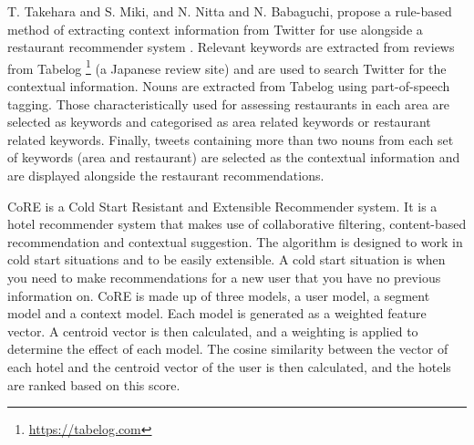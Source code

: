 T. Takehara and S. Miki, and N. Nitta  and N. Babaguchi, propose a rule-based method of extracting context information from Twitter for use alongside a restaurant recommender system \cite{takeharaContext2012}. Relevant keywords are extracted from reviews from Tabelog \footnote{\url{https://tabelog.com}} (a Japanese review site) and are used to search Twitter for the contextual information. Nouns are extracted from Tabelog using part-of-speech tagging. Those characteristically used for assessing restaurants in each area are selected as keywords and categorised as area related keywords or restaurant related keywords. Finally, tweets containing more than two nouns from each set of keywords (area and restaurant) are selected as the contextual information and are displayed alongside the restaurant recommendations.

CoRE \cite{core2019} is a Cold Start Resistant and Extensible Recommender system. It is a hotel recommender system that makes use of collaborative filtering, content-based recommendation and contextual suggestion. The algorithm is designed to work in cold start situations and to be easily extensible. A cold start situation is when you need to make recommendations for a new user that you have no previous information on. CoRE is made up of three models, a user model, a segment model and a context model. Each model is generated as a weighted feature vector. A centroid vector is then calculated, and a weighting is applied to determine the effect of each model. The cosine similarity between the vector of each hotel and the centroid vector of the user is then calculated, and the hotels are ranked based on this score.



